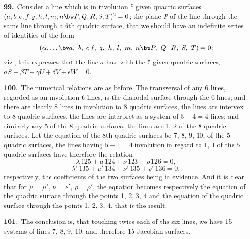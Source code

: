 \documentclass[11pt,a4paper]{article}
\begin{document}
\medskip

\textbf{99.}\ Consider a line which is in involution 5 given quadric surfaces $(a, b, c, f, g, h, l, m, n \bw P, Q, R, S, T)^2 = 0$; the plane $P$ of the line through the same line through a 6th quadric surface, that we should have an indefinite series of identities of the form
\[
(\alpha,\ldots\bw a,\ b,\ c\, f,\ g,\ h,\ l,\ m,\ n \bw P,\ Q,\ R,\ S,\ T) = 0;
\]
viz., this expresses that the line $a$ has, with the 5 given quadric surfaces, $aS + \beta T + \gamma U + \delta V + \epsilon W = 0$.

\medskip

\textbf{100.}\ The numerical relations are as before. The transversal of any 6 lines, regarded as an involution 6 lines, is the dianodal surface through the 6 lines; and there are clearly 8 lines in involution to 8 quadric surfaces, the lines are intervex to 8 quadric surfaces, the lines are interpret as a system of $8 - 4 = 4$ lines; and similarly any 5 of the 8 quadric surfaces, the lines are 1, 2 of the 8 quadric surfaces. Let the equation of the 8th quadric surfaces be 7, 8, 9, 10, of the 5 quadric surfaces, the lines having $5 - 1 = 4$ involution in regard to 1, 1 of the 5 quadric surfaces have therefore the relation
\[
\lambda\,125 + \mu\,124 + \nu\,123 + \rho\,126 = 0,
\]
\[
\lambda'\,135 + \mu'\,134 + \nu'\,135 + \rho'\,136 = 0,
\]
respectively, the coefficients of the two surfaces being in evidence. And it is clear that for $\mu = \mu'$, $\nu = \nu'$, $\rho = \rho'$, the equation becomes respectively the equation of the quadric surface through the points 1, 2, 3, 4 and the equation of the quadric surface through the points 1, 2, 3, 4, that is the result.

\medskip

\textbf{101.}\ The conclusion is, that touching twice each of the six lines, we have 15 systems of lines 7, 8, 9, 10, and therefore 15 Jacobian surfaces.

\newpage
\setcounter{page}{173}
\end{document}
